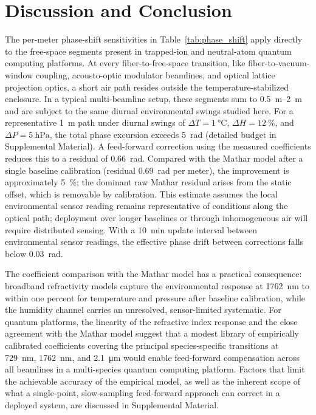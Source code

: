 \documentclass[aps,prapplied,reprint,groupedaddress,twocolumn,superscriptaddress,linenumbers]{revtex4-2}
\begin{document}
\section{Discussion and Conclusion}
\label{sec:discussion}

The per-meter phase-shift sensitivities in Table~\ref{tab:phase_shift} apply directly to the free-space segments present in trapped-ion and neutral-atom quantum computing platforms. At every fiber-to-free-space transition, like fiber-to-vacuum-window coupling, acousto-optic modulator beamlines, and optical lattice projection optics, a short air path resides outside the temperature-stabilized enclosure. In a typical multi-beamline setup, these segments sum to \SIrange{0.5}{2}{\meter} and are subject to the same diurnal environmental swings studied here. For a representative \SI{1}{\meter} path under diurnal swings of $\Delta T = \SI{1}{\degreeCelsius}$, $\Delta H = \SI{12}{\percent}$, and $\Delta P = \SI{5}{\hecto\pascal}$, the total phase excursion exceeds \SI{5}{\radian} (detailed budget in Supplemental Material). A feed-forward correction using the measured coefficients reduces this to a residual of \SI{0.66}{\radian}. Compared with the Mathar model after a single baseline calibration (residual \SI{0.69}{\radian} per meter), the improvement is approximately \SI{5}{\percent}; the dominant raw Mathar residual arises from the static offset, which is removable by calibration. This estimate assumes the local environmental sensor reading remains representative of conditions along the optical path; deployment over longer baselines or through inhomogeneous air will require distributed sensing. With a \SI{10}{\minute} update interval between environmental sensor readings, the effective phase drift between corrections falls below \SI{0.03}{\radian}.

The coefficient comparison with the Mathar model has a practical consequence: broadband refractivity models capture the environmental response at \SI{1762}{\nano\meter} to within one percent for temperature and pressure after baseline calibration, while the humidity channel carries an unresolved, sensor-limited systematic. For quantum platforms, the linearity of the refractive index response and the close agreement with the Mathar model suggest that a modest library of empirically calibrated coefficients covering the principal species-specific transitions at \SI{729}{\nano\meter}, \SI{1762}{\nano\meter}, and \SI{2.1}{\micro\meter} would enable feed-forward compensation across all beamlines in a multi-species quantum computing platform. Factors that limit the achievable accuracy of the empirical model, as well as the inherent scope of what a single-point, slow-sampling feed-forward approach can correct in a deployed system, are discussed in Supplemental Material.
\end{document}
